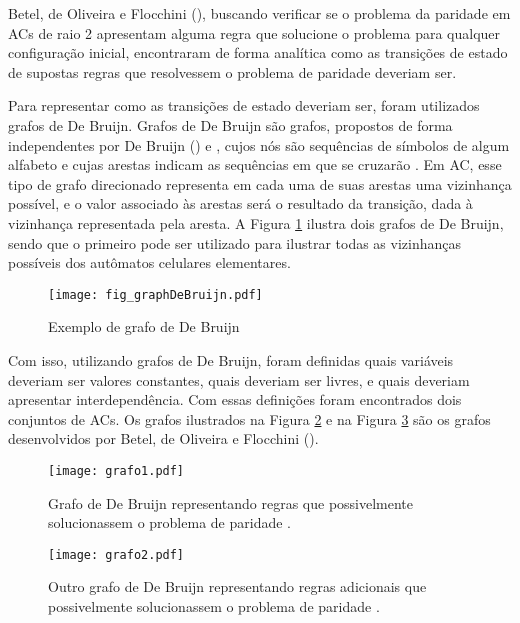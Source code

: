 Betel, de Oliveira e Flocchini (\citeyear{Betel2013}), buscando verificar se o problema da paridade em ACs de raio 2 apresentam alguma regra que solucione o problema para qualquer configuração inicial, encontraram de forma analítica como as transições de estado de supostas regras que resolvessem o problema de paridade deveriam ser. 

Para representar como as transições de estado deveriam ser, foram utilizados grafos de De Bruijn. Grafos de De Bruijn são grafos, propostos de forma independentes por De Bruijn (\citeyear{Bruijn946combinatorial}) e , cujos nós são sequências de símbolos de algum alfabeto e cujas arestas indicam as sequências em que se cruzarão \cite{weisstein2015deBruijn}. Em AC, esse tipo de grafo direcionado representa em cada uma de suas arestas uma vizinhança possível, e o valor associado às arestas será o resultado da transição, dada à vizinhança representada pela aresta. A Figura \ref{fig:grafosDeBruijnSample} ilustra dois grafos de De Bruijn, sendo que o primeiro pode ser utilizado para ilustrar todas as vizinhanças possíveis dos autômatos celulares elementares.

\begin{figure}[h!]
\centering
\texttt{[image: fig\_graphDeBruijn.pdf]}
\caption{Exemplo de grafo de De Bruijn \cite{Good1946normal}}
\label{fig:grafosDeBruijnSample}
\end{figure}

Com isso, utilizando grafos de De Bruijn, foram definidas quais variáveis deveriam ser valores constantes, quais deveriam ser livres, e quais deveriam apresentar interdependência. Com essas definições foram encontrados dois conjuntos de ACs. Os grafos ilustrados na Figura \ref{fig:grafosDeBruijn} e na Figura \ref{fig:grafosDeBruijn2} são os grafos desenvolvidos por Betel, de Oliveira e Flocchini (\citeyear{Betel2013}).

\begin{figure}[h!]
\centering
\texttt{[image: grafo1.pdf]}
\caption{Grafo de De Bruijn representando regras que possivelmente solucionassem o problema de paridade \cite{Betel2013}.}
\label{fig:grafosDeBruijn}
\end{figure}

\begin{figure}[h!]
\centering
\texttt{[image: grafo2.pdf]}
\caption{Outro grafo de De Bruijn representando regras adicionais que possivelmente solucionassem o problema de paridade \cite{Betel2013}.}
\label{fig:grafosDeBruijn2}
\end{figure}

